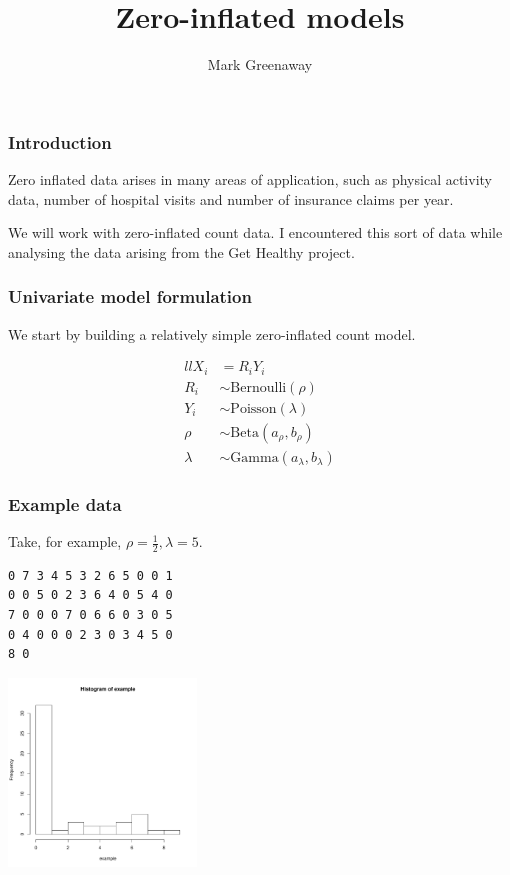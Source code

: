 \documentclass{beamer}
\title{Zero-inflated models}
\author{Mark Greenaway}
\begin{document}
\begin{frame}
\titlepage
\end{frame}

\begin{frame}
\frametitle{Introduction}
Zero inflated data arises in many areas of application, such as physical
activity data, number of hospital visits and number of insurance claims per
year.

We will work with zero-inflated count data. I encountered this sort of data while
analysing the data arising from the Get Healthy project.
\end{frame}
\begin{frame}
\frametitle{Univariate model formulation}
We start by building a relatively simple zero-inflated count model.

\begin{align*}{ll}
X_i &= R_i Y_i \\
R_i &\sim \text{Bernoulli}(\rho) \\
Y_i &\sim \text{Poisson}(\lambda) \\
\rho &\sim \text{Beta}(a_\rho, b_\rho) \\
\lambda &\sim \text{Gamma}(a_\lambda, b_\lambda)
\end{align*}

\end{frame}

\begin{frame}[fragile]
\frametitle{Example data}
Take, for example, $\rho = \frac{1}{2}, \lambda = 5$.

\begin{verbatim}
0 7 3 4 5 3 2 6 5 0 0 1
0 0 5 0 2 3 6 4 0 5 4 0
7 0 0 0 7 0 6 6 0 3 0 5
0 4 0 0 0 2 3 0 3 4 5 0
8 0
\end{verbatim}

\includegraphics[width=50mm, height=50mm]{code/univariate_data_histogram.pdf}
\end{frame}
\end{document}
